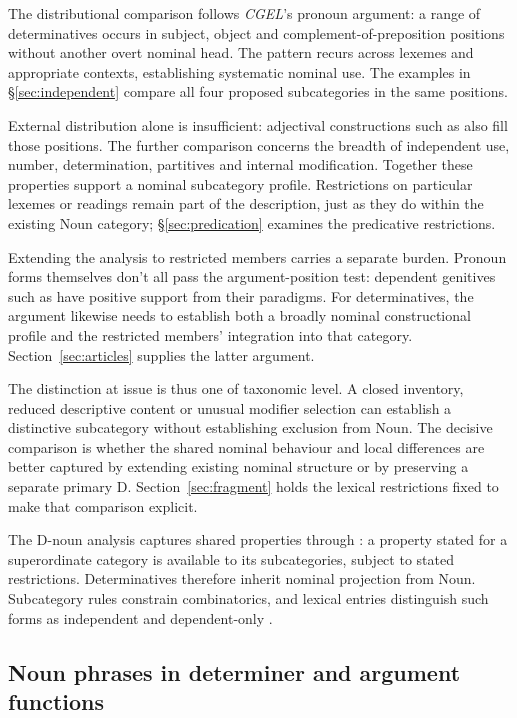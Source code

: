 \documentclass[12pt]{article}
\begin{document}
The distributional comparison follows \textit{CGEL}'s pronoun argument: a range of determinatives occurs in subject, object and complement-of-preposition positions without another overt nominal head. The pattern recurs across lexemes and appropriate contexts, establishing systematic nominal use. The examples in §\ref{sec:independent} compare all four proposed subcategories in the same positions.

External distribution alone is insufficient: adjectival constructions such as  also fill those positions. The further comparison concerns the breadth of independent use, number, determination, partitives and internal modification. Together these properties support a nominal subcategory profile. Restrictions on particular lexemes or readings remain part of the description, just as they do within the existing Noun category; §\ref{sec:predication} examines the predicative restrictions.

Extending the analysis to restricted members carries a separate burden. Pronoun forms themselves don't all pass the argument-position test: dependent genitives such as  have positive support from their paradigms. For determinatives, the argument likewise needs to establish both a broadly nominal constructional profile and the restricted members' integration into that category. Section~\ref{sec:articles} supplies the latter argument.

The distinction at issue is thus one of taxonomic level. A closed inventory, reduced descriptive content or unusual modifier selection can establish a distinctive subcategory without establishing exclusion from Noun. The decisive comparison is whether the shared nominal behaviour and local differences are better captured by extending existing nominal structure or by preserving a separate primary D. Section~\ref{sec:fragment} holds the lexical restrictions fixed to make that comparison explicit.

The D-noun analysis captures shared properties through : a property stated for a superordinate category is available to its subcategories, subject to stated restrictions. Determinatives therefore inherit nominal projection from Noun. Subcategory rules constrain combinatorics, and lexical entries distinguish such forms as independent  and dependent-only .

\subsection{Noun phrases in determiner and argument functions}\label{sec:bridge}
\end{document}
